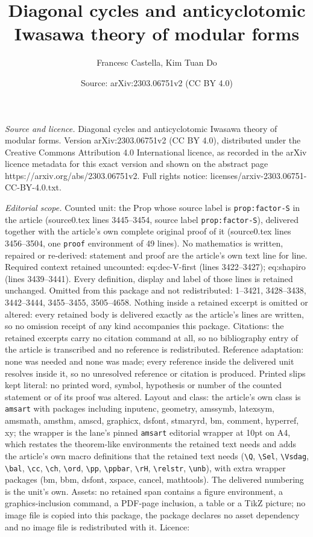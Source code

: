 \documentclass[10pt,a4paper]{amsart}
\title[Diagonal cycles and anticyclotomic Iwasawa theory of modular]{Diagonal cycles and anticyclotomic Iwasawa theory of modular forms}
\author{Francesc Castella, Kim Tuan Do}
\date{Source: arXiv:2303.06751v2 (CC BY 4.0)}
\begin{document}
\maketitle

\noindent\emph{Source and licence.} Diagonal cycles and anticyclotomic Iwasawa theory of modular forms. Version arXiv:2303.06751v2 (CC BY 4.0), distributed under the Creative Commons Attribution 4.0 International licence, as recorded in the arXiv licence metadata for this exact version and shown on the abstract page https://arxiv.org/abs/2303.06751v2. Full rights notice: licenses/arxiv-2303.06751-CC-BY-4.0.txt.\par\smallskip

\noindent\textit{Editorial scope.} Counted unit: the Prop whose source label is \texttt{prop:factor-S} in the article (source0.tex lines 3445--3454, source label \texttt{prop:factor-S}), delivered together with the article's own complete original proof of it (source0.tex lines 3456--3504, one \texttt{proof} environment of 49 lines). No mathematics is written, repaired or re-derived: statement and proof are the article's own text line for line. Required context retained uncounted: eq:dec-V-first (lines 3422--3427); eq:shapiro (lines 3439--3441). Every definition, display and label of those lines is retained unchanged. Omitted from this package and not redistributed: 1--3421, 3428--3438, 3442--3444, 3455--3455, 3505--4658. Nothing inside a retained excerpt is omitted or altered: every retained body is delivered exactly as the article's lines are written, so no omission receipt of any kind accompanies this package. Citations: the retained excerpts carry no citation command at all, so no bibliography entry of the article is transcribed and no reference is redistributed. Reference adaptation: none was needed and none was made; every reference inside the delivered unit resolves inside it, so no unresolved reference or citation is produced. Printed slips kept literal: no printed word, symbol, hypothesis or number of the counted statement or of its proof was altered. Layout and class: the article's own class is \texttt{amsart} with packages including inputenc, geometry, amssymb, latexsym, amsmath, amsthm, amscd, graphicx, dsfont, stmaryrd, bm, comment, hyperref, xy; the wrapper is the lane's pinned \texttt{amsart} editorial wrapper at 10pt on A4, which restates the theorem-like environments the retained text needs and adds the article's own macro definitions that the retained text needs (\texttt{\textbackslash Q}, \texttt{\textbackslash Sel}, \texttt{\textbackslash Vsdag}, \texttt{\textbackslash bal}, \texttt{\textbackslash cc}, \texttt{\textbackslash ch}, \texttt{\textbackslash ord}, \texttt{\textbackslash pp}, \texttt{\textbackslash ppbar}, \texttt{\textbackslash rH}, \texttt{\textbackslash relstr}, \texttt{\textbackslash unb}), with extra wrapper packages (bm, bbm, dsfont, xspace, cancel, mathtools). The delivered numbering is the unit's own. Assets: no retained span contains a figure environment, a graphics-inclusion command, a PDF-page inclusion, a table or a TikZ picture; no image file is copied into this package, the package declares no asset dependency and no image file is redistributed with it. Licence: 
\end{document}
